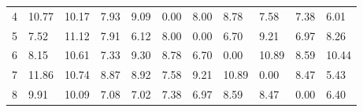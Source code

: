 \documentclass{article}
\begin{document}
\begin{table}[]
\begin{tabular}{lllllllllll}
		\multicolumn{1}{l|}{4} & \multicolumn{1}{l|}{10.77}                        & \multicolumn{1}{l|}{10.17}                        & \multicolumn{1}{l|}{7.93}                         & \multicolumn{1}{l|}{9.09}                         & \multicolumn{1}{l|}{\cellcolor[HTML]{C0C0C0}0.00} & \multicolumn{1}{l|}{8.00}                         & \multicolumn{1}{l|}{8.78}                         & \multicolumn{1}{l|}{7.58}                         & \multicolumn{1}{l|}{7.38}                         & \multicolumn{1}{l|}{6.01}                         \\ \cline{2-11} 
		\multicolumn{1}{l|}{5} & \multicolumn{1}{l|}{7.52}                         & \multicolumn{1}{l|}{11.12}                        & \multicolumn{1}{l|}{7.91}                         & \multicolumn{1}{l|}{6.12}                         & \multicolumn{1}{l|}{8.00}                         & \multicolumn{1}{l|}{\cellcolor[HTML]{C0C0C0}0.00} & \multicolumn{1}{l|}{6.70}                         & \multicolumn{1}{l|}{9.21}                         & \multicolumn{1}{l|}{6.97}                         & \multicolumn{1}{l|}{8.26}                         \\ \cline{2-11} 
		\multicolumn{1}{l|}{6} & \multicolumn{1}{l|}{8.15}                         & \multicolumn{1}{l|}{10.61}                        & \multicolumn{1}{l|}{7.33}                         & \multicolumn{1}{l|}{9.30}                         & \multicolumn{1}{l|}{8.78}                         & \multicolumn{1}{l|}{6.70}                         & \multicolumn{1}{l|}{\cellcolor[HTML]{C0C0C0}0.00} & \multicolumn{1}{l|}{10.89}                        & \multicolumn{1}{l|}{8.59}                         & \multicolumn{1}{l|}{10.44}                        \\ \cline{2-11} 
		\multicolumn{1}{l|}{7} & \multicolumn{1}{l|}{11.86}                        & \multicolumn{1}{l|}{10.74}                        & \multicolumn{1}{l|}{8.87}                         & \multicolumn{1}{l|}{8.92}                         & \multicolumn{1}{l|}{7.58}                         & \multicolumn{1}{l|}{9.21}                         & \multicolumn{1}{l|}{10.89}                        & \multicolumn{1}{l|}{\cellcolor[HTML]{C0C0C0}0.00} & \multicolumn{1}{l|}{8.47}                         & \multicolumn{1}{l|}{5.43}                         \\ \cline{2-11} 
		\multicolumn{1}{l|}{8} & \multicolumn{1}{l|}{9.91}                         & \multicolumn{1}{l|}{10.09}                        & \multicolumn{1}{l|}{7.08}                         & \multicolumn{1}{l|}{7.02}                         & \multicolumn{1}{l|}{7.38}                         & \multicolumn{1}{l|}{6.97}                         & \multicolumn{1}{l|}{8.59}                         & \multicolumn{1}{l|}{8.47}                         & \multicolumn{1}{l|}{\cellcolor[HTML]{C0C0C0}0.00} & \multicolumn{1}{l|}{6.40}                         \\ \cline{2-11} 

\end{tabular}
\end{table}
\end{document}
